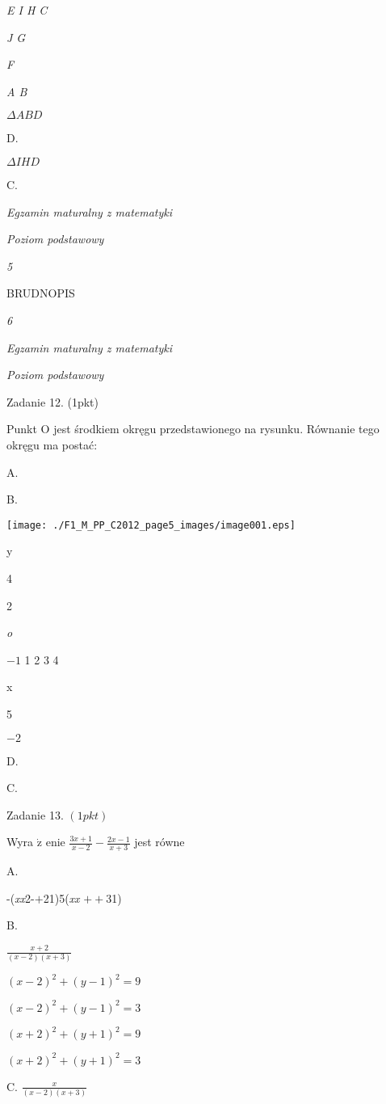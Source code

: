 \documentclass[a4paper,12pt]{article}
\begin{document}
{\it E  I H  C}

{\it J  G}

{\it F}

{\it A B}

$\Delta ABD$

D.

$\Delta IHD$

C.





{\it Egzamin maturalny z matematyki}

{\it Poziom podstawowy}

{\it 5}

BRUDNOPIS





{\it 6}

{\it Egzamin maturalny z matematyki}

{\it Poziom podstawowy}

Zadanie 12. (1pkt)

Punkt O jest środkiem okręgu przedstawionego na rysunku. Równanie tego okręgu ma postać:

A.

B.
\begin{center}
\texttt{[image: ./F1\_M\_PP\_C2012\_page5\_images/image001.eps]}
\end{center}
y

4

2

{\it o}

$-1$  1 2  3 4

x

5

$-2$

D.

C.

Zadanie 13. $(1pkt)$

Wyra $\dot{\mathrm{z}}$ enie $\displaystyle \frac{3x+1}{x-2}-\frac{2x-1}{x+3}$ jest równe

A.

-({\it xx}2-$+$21)5({\it xx} $++$31)

B.

$\displaystyle \frac{x+2}{(x-2)(x+3)}$

$(x-2)^{2}+(y-1)^{2}=9$

$(x-2)^{2}+(y-1)^{2}=3$

$(x+2)^{2}+(y+1)^{2}=9$

$(x+2)^{2}+(y+1)^{2}=3$

C. $\displaystyle \frac{x}{(x-2)(x+3)}$
\end{document}
